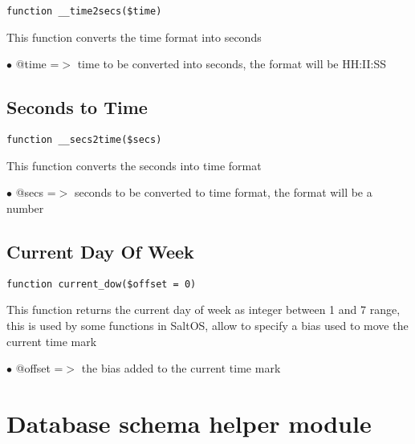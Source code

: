 \documentclass[a4paper]{book}
\begin{document}
\begin{lstlisting}
function __time2secs($time)
\end{lstlisting}

This function converts the time format into seconds

\begin{compactitem}
\item[\color{myblue}$\bullet$] @time =$>$ time to be converted into seconds, the format will be HH:II:SS
\end{compactitem}

\hypertarget{toc83}{}
\subsection{Seconds to Time}

\begin{lstlisting}
function __secs2time($secs)
\end{lstlisting}

This function converts the seconds into time format

\begin{compactitem}
\item[\color{myblue}$\bullet$] @secs =$>$ seconds to be converted to time format, the format will be a number
\end{compactitem}

\hypertarget{toc84}{}
\subsection{Current Day Of Week}

\begin{lstlisting}
function current_dow($offset = 0)
\end{lstlisting}

This function returns the current day of week as integer between 1 and 7
range, this is used by some functions in SaltOS, allow to specify a bias
used to move the current time mark

\begin{compactitem}
\item[\color{myblue}$\bullet$] @offset =$>$ the bias added to the current time mark
\end{compactitem}

\hypertarget{toc85}{}
\section{Database schema helper module}
\end{document}
